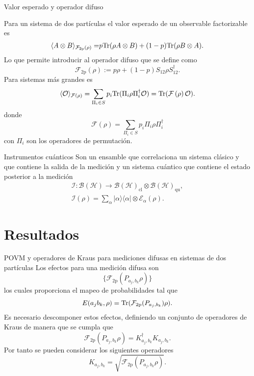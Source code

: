 \documentclass[svgnames,12pt,aspectratio=149]{beamer}
\newcommand{\ra}{\rangle}
\newcommand{\la}{\langle}
\newcommand{\rala}{\rangle\langle}
\newcommand{\tr}{{\rm Tr}}
\newcommand{\E}{\mathcal{E}}
\newcommand{\tensor}{\otimes}
\newcommand{\fuzzy}[1]{\mathcal{F}\left(#1\right)}
\newcommand{\permut}[2]{\Pi_{#1}#2\Pi_{#1}^{\dagger}}
\begin{document}
\begin{frame}{Valor esperado y operador difuso}

 
Para un sistema de dos partículas el valor esperado de un observable factorizable es 
\begin{equation*}\label{eq:Expected-Value-FM-2p}
    \begin{split}
      \la {A\otimes B}\ra_{\mathcal{F}_{2\text{p}}(\rho)} =&p\tr(\rho A\tensor B)+(1-p)\tr(\rho B\otimes A).\\
    \end{split}
\end{equation*}Lo que permite introducir al operador difuso que se define como \begin{equation*}\label{eq:op_F2p}
    \mathcal{F}_{2\text{p}}(\rho):=p\rho + (1-p)S_{12}\rho S_{12}^{\dagger}.
\end{equation*}
Para sistemas más grandes es 
\begin{equation*}\label{eq:expected-value-fm-general}
    \la \mathcal{O}\ra_{\fuzzy{\rho}}=\sum_{\Pi_i\in S}p_i\tr(\permut{i}{\rho}\mathcal{O}) =\tr(\fuzzy{\rho}\mathcal{O}).
\end{equation*} donde \begin{equation*}\label{eq:fuzzy-op-nparticles}
    \fuzzy{\rho}=\sum_{\Pi_i\in S}p_{i}\permut{i}{\rho}
 \end{equation*} con $\Pi_i$ son los operadores de permutación.

\end{frame}

\begin{frame}{Instrumentos cuánticos}
  Son un ensamble que correlaciona un sistema clásico y que contiene la salida de la medición y un sistema cuántico que contiene el estado posterior a la medición \begin{equation*}
    \begin{split}
        \mathcal{I}: \mathcal{B(H)}\rightarrow\mathcal{B(H)}_{\text{cl}}\otimes \mathcal{B(H)}_{\text{qu}},\\
    \mathcal{I}(\rho)=\sum_\alpha |\alpha\rala\alpha|\otimes \E_\alpha(\rho).
    \end{split}
\end{equation*}
\end{frame}


\section{Resultados}
\begin{frame}{POVM y operadores de Kraus para mediciones difusas en sistemas de dos partículas}
  Los efectos para una medición difusa son \[\{\mathcal{F}_{2\text{p}}(P_{a_j,b_k}\rho)\}\]los cuales proporciona el mapeo de probabilidades tal que \[   E(a_j b_k, \rho)= \tr(\mathcal{F}_{2\text{p}}({P_{a_j,b_k}})\rho).\] Es necesario descomponer estos efectos, definiendo un conjunto de operadores de Kraus de manera que se cumpla que \[\mathcal{F}_{2\text{p}}(P_{a_j,b_k}\rho)=K_{a_j,b_k}^\dagger K_{a_j,b_k}.\] Por tanto se pueden considerar los siguientes operadores \[K_{a_j,b_k}=\sqrt{\mathcal{F}_{2\text{p}}(P_{a_j,b_k}\rho)}.\]
\end{frame}
\end{document}
